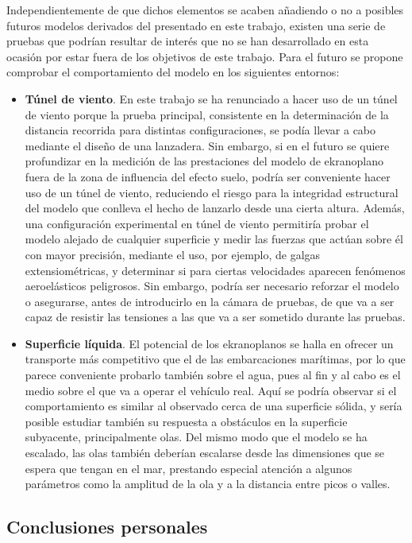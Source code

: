 Independientemente de que dichos elementos se acaben añadiendo o no a posibles futuros modelos derivados del presentado en este trabajo, existen una serie de pruebas que podrían resultar de interés que no se han desarrollado en esta ocasión por estar fuera de los objetivos de este trabajo. Para el futuro se propone comprobar el comportamiento del modelo en los siguientes entornos:
\begin{itemize}
\item \textbf{Túnel de viento}. En este trabajo se ha renunciado a hacer uso de un túnel de viento porque la prueba principal, consistente en la determinación de la distancia recorrida para distintas configuraciones, se podía llevar a cabo mediante el diseño de una lanzadera. Sin embargo, si en el futuro se quiere profundizar en la medición de las prestaciones del modelo de ekranoplano fuera de la zona de influencia del efecto suelo, podría ser conveniente hacer uso de un túnel de viento, reduciendo el riesgo para la integridad estructural del modelo que conlleva el hecho de lanzarlo desde una cierta altura. Además, una configuración experimental en túnel de viento permitiría probar el modelo alejado de cualquier superficie y medir las fuerzas que actúan sobre él con mayor precisión, mediante el uso, por ejemplo, de galgas extensiométricas, y determinar si para ciertas velocidades aparecen fenómenos aeroelásticos peligrosos. Sin embargo, podría ser necesario reforzar el modelo o asegurarse, antes de introducirlo en la cámara de pruebas, de que va a ser capaz de resistir las tensiones a las que va a ser sometido durante las pruebas.
\item \textbf{Superficie líquida}. El potencial de los ekranoplanos se halla en ofrecer un transporte más competitivo que el de las embarcaciones marítimas, por lo que parece conveniente probarlo también sobre el agua, pues al fin y al cabo es el medio sobre el que va a operar el vehículo real. Aquí se podría observar si el comportamiento es similar al observado cerca de una superficie sólida, y sería posible estudiar también su respuesta a obstáculos en la superficie subyacente, principalmente olas. Del mismo modo que el modelo se ha escalado, las olas también deberían escalarse desde las dimensiones que se espera que tengan en el mar, prestando especial atención a algunos parámetros como la amplitud de la ola y a la distancia entre picos o valles.
\end{itemize}


\subsection{Conclusiones personales}
\label{sec:conclusions:personal}

